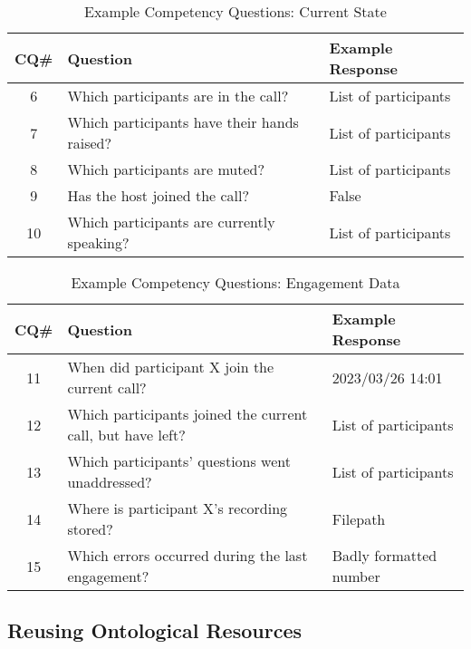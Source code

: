 \begin{table}
  \caption{Example Competency Questions: Current State}
  \label{tab:CQ_state}
  \begin{tabular}{cll}
    \toprule
    CQ\#&Question&Example Response\\
    \midrule
    6&Which participants are in the call?&List of participants\\
    7&Which participants have their hands raised?&List of participants\\
    8&Which participants are muted?&List of participants\\
    9&Has the host joined the call?&False\\
    10&Which participants are currently speaking?&List of participants\\
  \bottomrule
\end{tabular}
\end{table}

\begin{table}
  \caption{Example Competency Questions: Engagement Data}
  \label{tab:CQ_data}
  \begin{tabular}{cll}
    \toprule
    CQ\#&Question&Example Response\\
    \midrule
    11&When did participant X join the current call?&2023/03/26 14:01\\
    12&Which participants joined the current call, but have left?&List of participants\\
    13&Which participants' questions went unaddressed?&List of participants\\
    14&Where is participant X’s recording stored?&Filepath\\
    15&Which errors occurred during the last engagement?&Badly formatted number\\
  \bottomrule
\end{tabular}
\end{table}

\subsection{Reusing Ontological Resources}

